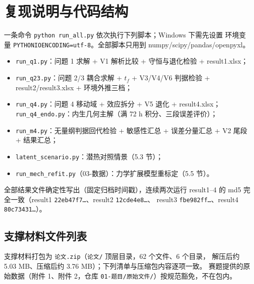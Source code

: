 \documentclass[12pt,a4paper]{ctexart}
\numberwithin{equation}{section}
\begin{document}
\section{复现说明与代码结构}
一条命令 \texttt{python run\_all.py} 依次执行下列脚本；Windows 下需先设置
环境变量 \texttt{PYTHONIOENCODING=utf-8}。全部脚本只用到
numpy/scipy/pandas/openpyxl。
\begin{itemize}
  \item \texttt{run\_q1.py}：问题 1 求解 + V1 解析比较 + 守恒与退化检验 + result1.xlsx；
  \item \texttt{run\_q23.py}：问题 2/3 耦合求解 + $t_f$ + V3/V4/V6 判据检验 +
        result2/result3.xlsx + 环境外推三档；
  \item \texttt{run\_q4.py}：问题 4 移动域 + 效应拆分 + V5 退化 + result4.xlsx；
        \texttt{run\_q4\_endo.py}：内生几何主解（满 72 h 积分、三段误差评价）；
  \item \texttt{run\_m4.py}：无量纲判据回代检验 + 敏感性汇总 + 误差分量汇总 +
        V2 尾段 + 结果汇总；
  \item \texttt{latent\_scenario.py}：潜热对照情景（5.3 节）；
  \item \texttt{run\_mech\_refit.py}（03-数据）：力学扩展模型重标定（5.5 节）。
\end{itemize}
全部结果文件确定性写出（固定归档时间戳），连续两次运行 result1--4 的 md5
完全一致（result1 \texttt{22eb47f7…}、result2 \texttt{12cde4e8…}、
result3 \texttt{fbe982ff…}、result4 \texttt{80c73431…}）。

\subsection*{支撑材料文件列表}
支撑材料打包为 \texttt{论文.zip}（\texttt{论文/} 顶层目录，62 个文件、6 个目录，
解压后约 5.03 MB、压缩后约 3.76 MB）；下列清单与压缩包内容逐项一致。
赛题提供的原始数据（附件 1、附件 2，仓库 \texttt{01-题目/原始文件/}）按规范豁免，不在包内。
\end{document}
